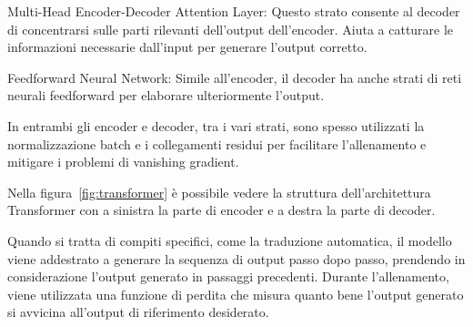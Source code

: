 Multi-Head Encoder-Decoder Attention Layer: Questo strato consente al decoder di concentrarsi sulle parti rilevanti dell'output dell'encoder. Aiuta a catturare le informazioni necessarie dall'input per generare l'output corretto.

Feedforward Neural Network: Simile all'encoder, il decoder ha anche strati di reti neurali feedforward per elaborare ulteriormente l'output.

In entrambi gli encoder e decoder, tra i vari strati, sono spesso utilizzati la normalizzazione batch e i collegamenti residui per facilitare l'allenamento e mitigare i problemi di vanishing gradient.

Nella figura~\ref{fig:transformer} è possibile vedere la struttura dell'architettura Transformer con a sinistra la parte di encoder e a destra la parte di decoder.

Quando si tratta di compiti specifici, come la traduzione automatica, il modello viene addestrato a generare la sequenza di output passo dopo passo, prendendo in considerazione l'output generato in passaggi precedenti. Durante l'allenamento, viene utilizzata una funzione di perdita che misura quanto bene l'output generato si avvicina all'output di riferimento desiderato.

